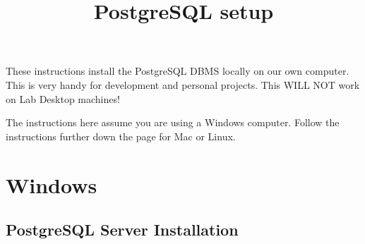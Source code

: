 \documentclass{pgnotes}
\title{PostgreSQL setup}
\begin{document}
\maketitle

These instructions install the PostgreSQL DBMS locally on our own computer.
This is very handy for development and personal projects.
This WILL NOT work on Lab Desktop machines!

The instructions here assume you are using a Windows computer.
Follow the instructions further down the page for Mac or Linux.

\section{Windows}
\label{sec:postgresql-setup-windows}

\subsection{PostgreSQL Server Installation}
\end{document}
